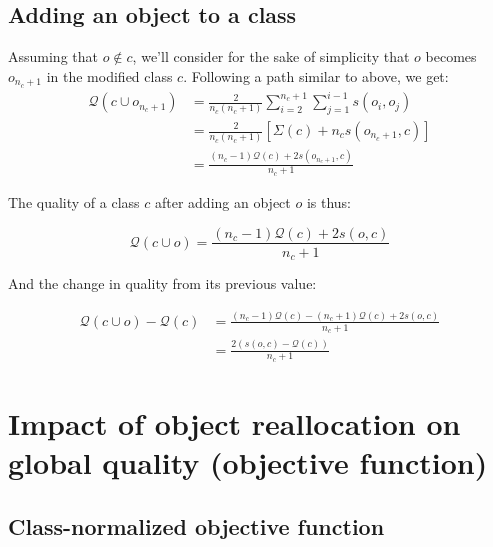 \documentclass[a4paper,twoside]{article}
\begin{document}
\subsection{Adding an object to a class}

Assuming that $o \notin c$, we'll consider for the sake of simplicity that $o$ becomes $o_{n_c+1}$ in the modified class $c$. Following a path similar to above, we get:
\begin{equation}
  \begin{aligned}
    \mathcal{Q}(c \cup o_{n_c+1}) & = \frac{2}{n_c(n_c+1)} \sum_{i=2}^{n_c+1} \sum_{j=1}^{i-1} s\left(o_i, o_j\right) \\
                                & = \frac{2}{n_c(n_c+1)} \left[\Sigma(c) + n_c s\left(o_{n_c+1}, c\right)\right] \\
                                & = \frac{(n_c-1) \mathcal{Q}(c)  + 2s\left(o_{n_c+1}, c\right)}{n_c+1}
  \end{aligned}
\end{equation}

The quality of a class $c$ after adding an object $o$ is thus:

\begin{equation}
  \mathcal{Q}\left(c \cup o\right) = \frac{(n_c-1) \mathcal{Q}(c)  + 2s\left(o, c\right)}{n_c+1}
\end{equation}

And the change in quality from its previous value:

\begin{equation} \label{deltaAdd}
  \begin{aligned}
    \mathcal{Q}\left(c \cup o\right) - \mathcal{Q}\left(c\right) & = \frac{(n_c-1) \mathcal{Q}(c)  - (n_c+1) \mathcal{Q}(c)  + 2s\left(o, c\right)}{n_c+1} \\
                                                                           & = \frac{2\left(s\left(o, c\right)-\mathcal{Q}(c)\right)}{n_c+1}
    \end{aligned}
\end{equation}




\section{Impact of object reallocation on global quality (objective function)}

\subsection{Class-normalized objective function}
\end{document}

